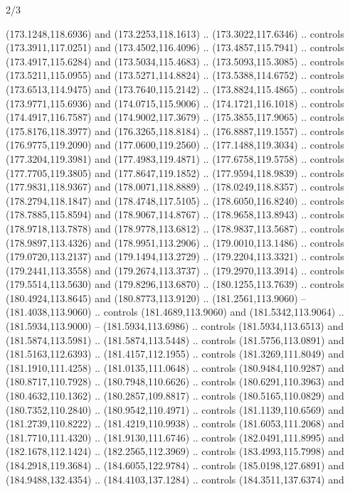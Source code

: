 \begin{flagdescription}{2/3}
\begin{scope}[shift={(0.5\flaglength,0.5)},scale=\flagwidth/320]
\begin{scope}[y=0.8pt, x=0.8pt, yscale=-1,shift={(-118.3,-146)}]
  (173.1248,118.6936) and (173.2253,118.1613) .. (173.3022,117.6346) .. controls
  (173.3911,117.0251) and (173.4502,116.4096) .. (173.4857,115.7941) .. controls
  (173.4917,115.6284) and (173.5034,115.4683) .. (173.5093,115.3085) .. controls
  (173.5211,115.0955) and (173.5271,114.8824) .. (173.5388,114.6752) .. controls
  (173.6513,114.9475) and (173.7640,115.2142) .. (173.8824,115.4865) .. controls
  (173.9771,115.6936) and (174.0715,115.9006) .. (174.1721,116.1018) .. controls
  (174.4917,116.7587) and (174.9002,117.3679) .. (175.3855,117.9065) .. controls
  (175.8176,118.3977) and (176.3265,118.8184) .. (176.8887,119.1557) .. controls
  (176.9775,119.2090) and (177.0600,119.2560) .. (177.1488,119.3034) .. controls
  (177.3204,119.3981) and (177.4983,119.4871) .. (177.6758,119.5758) .. controls
  (177.7705,119.3805) and (177.8647,119.1852) .. (177.9594,118.9839) .. controls
  (177.9831,118.9367) and (178.0071,118.8889) .. (178.0249,118.8357) .. controls
  (178.2794,118.1847) and (178.4748,117.5105) .. (178.6050,116.8240) .. controls
  (178.7885,115.8594) and (178.9067,114.8767) .. (178.9658,113.8943) .. controls
  (178.9718,113.7878) and (178.9778,113.6812) .. (178.9837,113.5687) .. controls
  (178.9897,113.4326) and (178.9951,113.2906) .. (179.0010,113.1486) .. controls
  (179.0720,113.2137) and (179.1494,113.2729) .. (179.2204,113.3321) .. controls
  (179.2441,113.3558) and (179.2674,113.3737) .. (179.2970,113.3914) .. controls
  (179.5514,113.5630) and (179.8296,113.6870) .. (180.1255,113.7639) .. controls
  (180.4924,113.8645) and (180.8773,113.9120) .. (181.2561,113.9060) --
  (181.4038,113.9060) .. controls (181.4689,113.9060) and (181.5342,113.9064) ..
  (181.5934,113.9000) -- (181.5934,113.6986) .. controls (181.5934,113.6513) and
  (181.5874,113.5981) .. (181.5874,113.5448) .. controls (181.5756,113.0891) and
  (181.5163,112.6393) .. (181.4157,112.1955) .. controls (181.3269,111.8049) and
  (181.1910,111.4258) .. (181.0135,111.0648) .. controls (180.9484,110.9287) and
  (180.8717,110.7928) .. (180.7948,110.6626) .. controls (180.6291,110.3963) and
  (180.4632,110.1362) .. (180.2857,109.8817) .. controls (180.5165,110.0829) and
  (180.7352,110.2840) .. (180.9542,110.4971) .. controls (181.1139,110.6569) and
  (181.2739,110.8222) .. (181.4219,110.9938) .. controls (181.6053,111.2068) and
  (181.7710,111.4320) .. (181.9130,111.6746) .. controls (182.0491,111.8995) and
  (182.1678,112.1424) .. (182.2565,112.3969) .. controls (183.4993,115.7998) and
  (184.2918,119.3684) .. (184.6055,122.9784) .. controls (185.0198,127.6891) and
  (184.9488,132.4354) .. (184.4103,137.1284) .. controls (184.3511,137.6374) and

\end{scope}
\end{scope}
\end{flagdescription}
